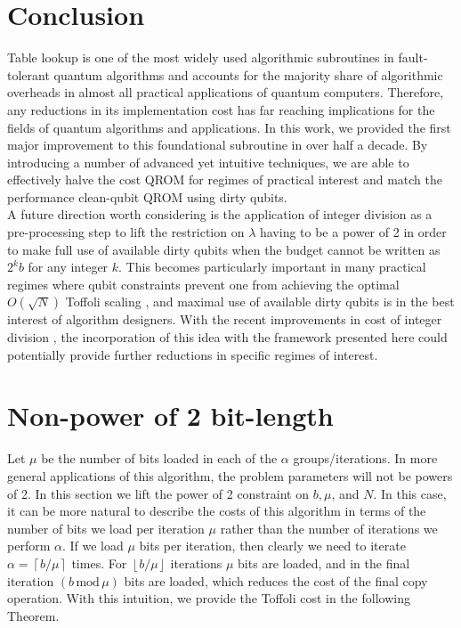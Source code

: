 \documentclass[a4paper, amsfonts, amssymb, amsmath, reprint, showkeys, twoside,superscriptaddress, onecolumn, nofootinbib]{revtex4-2}
\newcommand{\ceil}[1]{\left\lceil #1 \right\rceil}
\newcommand{\floor}[1]{\left\lfloor #1 \right\rfloor}
\begin{document}
\section{Conclusion}
Table lookup is one of the most widely used algorithmic subroutines in fault-tolerant quantum algorithms and accounts for the majority share of algorithmic overheads in almost all practical applications of quantum computers. Therefore, any reductions in its implementation cost has far reaching implications for the fields of quantum algorithms and applications. In this work, we provided the first major improvement to this foundational subroutine in over half a decade. By introducing a number of advanced yet intuitive techniques, we are able to effectively halve the cost QROM for regimes of practical interest and match the performance clean-qubit QROM using dirty qubits.\\

A future direction worth considering is the application of integer division as a pre-processing step to lift the restriction on $\lambda$ having to be a power of 2 \cite{low2024trading} in order to make full use of available dirty qubits when the budget cannot be written as $2^k  b$ for any integer $k$. This becomes particularly important in many practical regimes where qubit constraints prevent one from achieving the optimal $O(\sqrt{N})$ Toffoli scaling \cite{low2024trading}, and maximal use of available dirty qubits is in the best interest of algorithm designers. With the recent improvements in cost of integer division \cite{mukhopadhyay2026improved}, the incorporation of this idea with the framework presented here could potentially provide further reductions in specific regimes of interest.

\newpage


\newpage

\appendix

\section{Non-power of 2 bit-length}\label{sec:non_power}
Let $\mu$ be the number of bits loaded in each of the $\alpha$ groups/iterations. In more general applications of this algorithm, the problem parameters will not be powers of 2. In this section we lift the power of 2 constraint on $b, \mu$, and $N$. In this case, it can be more natural to describe the costs of this algorithm in terms of the number of bits we load per iteration $\mu$ rather than the number of iterations we perform $\alpha$. If we load $\mu$ bits per iteration, then clearly we need to iterate $\alpha = \ceil{b/\mu}$ times. For $\floor{b/\mu}$ iterations $\mu$ bits are loaded, and in the final iteration $(b \, \mathrm{mod} \, \mu)$ bits are loaded, which reduces the cost of the final copy operation. With this intuition, we provide the Toffoli cost in the following Theorem. 
\end{document}
